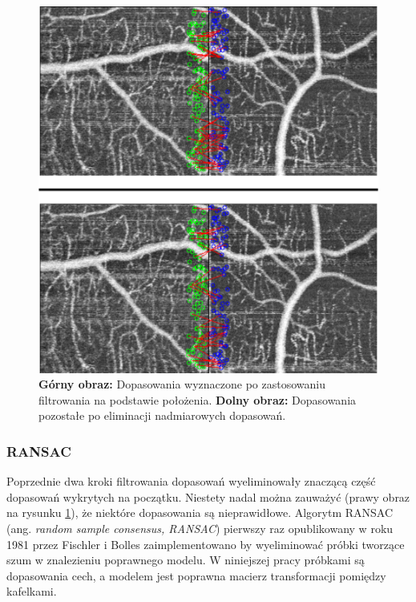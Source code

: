 \begin{figure}[htb]
  \centering
  \includegraphics[width=\textwidth]{gfx/no_repetition_filtering}
  \caption{\textbf{Górny obraz:} Dopasowania wyznaczone po zastosowaniu filtrowania na podstawie położenia. \textbf{Dolny obraz:} Dopasowania pozostałe po eliminacji nadmiarowych dopasowań.}
  \label{fig:proponowane_algorytmy:no_repetition_filtering}
\end{figure}

\subsubsection{RANSAC}
\label{sec:proponowane_algorytmy:ransac}

Poprzednie dwa kroki filtrowania dopasowań wyeliminowały znaczącą część dopasowań wykrytych na początku. Niestety nadal można zauważyć (prawy obraz na rysunku \ref{fig:proponowane_algorytmy:no_repetition_filtering}), że niektóre dopasowania są nieprawidłowe. Algorytm RANSAC (ang. \textit{random sample consensus, RANSAC}) pierwszy raz opublikowany w roku 1981 przez Fischler i Bolles \cite{Fischler:1981:RSC:358669.358692} zaimplementowano by wyeliminować próbki tworzące szum w znalezieniu poprawnego modelu. W niniejszej pracy próbkami są dopasowania cech, a modelem jest poprawna macierz transformacji pomiędzy kafelkami.

